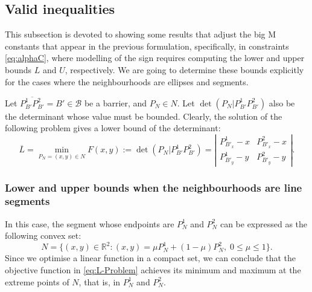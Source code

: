 \documentclass[a4paper,  review, authoryear, 1p.]{elsarticle}
\newcommand{\B}{{\mathcal B}}
\newcommand{\determinant}[3]{\det({#1|#2#3})}
\begin{document}
\subsection{Valid inequalities}
This subsection is devoted to showing some results that adjust the big M constants that appear in the previous formulation, specifically, in constraints \eqref{eq:alphaC}, where modelling of the sign requires computing the lower and upper bounds $L$ and $U$, respectively. We are going to determine these bounds explicitly for the cases where the neighbourhoods are ellipses and segments.

Let $\overline{P^1_{B'}P^2_{B'}}=B'\in\B$ be a barrier, and $P_N\in N$. Let $\determinant{P_N}{P_{B'}^1}{P_{B'}^2}$ also be the determinant whose value must be bounded. Clearly, the solution of the following problem gives a lower bound of the determinant:
\begin{equation*}\label{eq:L-Problem}\tag{L-Problem}
	\overline{L}=\min_{P_N=(x,y)\in N}F(x,y):=\determinant{P^{}_N}{P_{B'}^1}{P_{B'}^2}=\left|
	\begin{array}{cc}
		P^{1}_{B'_x}-x & P^{2}_{B'_x}-x \\
		P^{1}_{B'_y}-y & P^{2}_{B'_y}-y
	\end{array}
	\right|.
\end{equation*}

\subsubsection{Lower and upper bounds when the neighbourhoods are line segments}
In this case, the segment whose endpoints are $P^1_{N}$ and $P^2_{N}$ can be expressed as the following convex set:
$$N=\{(x,y)\in\mathbb R^2:(x,y)=\mu P^1_{N}+(1-\mu)P^2_{N}, \; 0\leq\mu\leq1\}.$$
Since we optimise a linear function in a compact set, we can conclude that the objective function in \eqref{eq:L-Problem} achieves its minimum and maximum at the extreme points of $N$, that is, in $P^1_{N}$ and $P^2_{N}$. 
\end{document}
